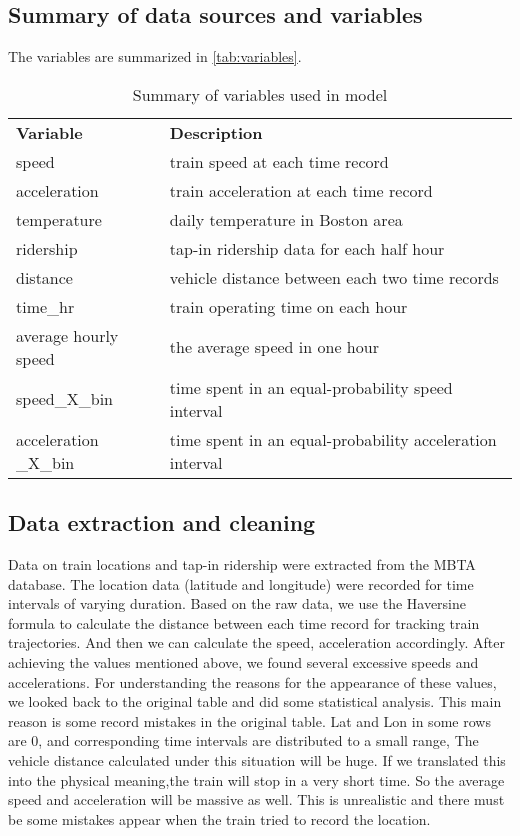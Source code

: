 \documentclass[preprint, 11pt]{elsarticle}
\newcommand{\?}{\stackrel{?}{=}}
\begin{document}
\subsection{Summary of data sources and variables}
The variables are summarized in \autoref{tab:variables}.
\begin{table}[ht]\footnotesize
    \centering
    \begin{tabular}{l l}\toprule
        \bf Variable & \bf Description \\
       speed  &  train speed at each time record \\
       acceleration  &  train acceleration at each time record \\
       temperature & daily temperature in Boston area\\
       ridership & tap-in ridership data for each half hour\\
       distance & vehicle distance between each two time records\\
       time\_hr & train operating time on each hour\\
       average hourly speed & the average speed in one hour\\
       speed\_X\_bin & time spent in an equal-probability speed interval \\
       acceleration \_X\_bin & time spent in an equal-probability acceleration interval \\
       \bottomrule
    \end{tabular}
    \caption{Summary of variables used in model}
    \label{tab:variables}
\end{table}








\subsection{Data extraction and cleaning}

Data on train locations and tap-in ridership were extracted from the MBTA database.
The location data (latitude and longitude) were recorded for time intervals of varying duration. Based on the raw data, we use the Haversine formula to calculate the distance between each time record for tracking train trajectories. And then we can calculate the speed, acceleration accordingly. 
After achieving the values mentioned above, we found several excessive speeds and accelerations. For understanding the reasons for the appearance of these values, we looked back to the original table and did some statistical analysis. 
This main reason is  some record mistakes in the original table. Lat and Lon in some rows are 0, and corresponding time intervals are distributed to a small range, The vehicle distance calculated under this situation will be huge. If we translated this into the physical meaning,the train will stop in a very short time. So the average speed and acceleration will be massive as well. This is unrealistic and there must be some mistakes appear when the train tried to record the location.
\end{document}
